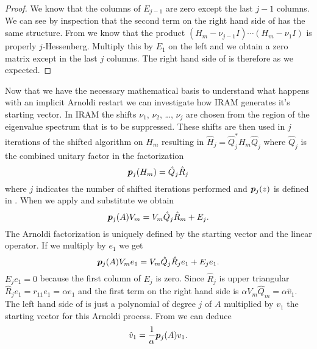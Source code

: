 \begin{proof}
We know that the columns of $E_{j-1}$ are zero except the last $j-1$ columns.  We can see by inspection that the second term on the right hand side of  has the same structure.  From  we know that the product $\left(H_m - \nu_{j-1}I\right)\cdots\left(H_m - \nu_1I\right)$ is properly $j$-Hessenberg.  Multiply this by $E_1$ on the left and we obtain a zero matrix except in the last $j$ columns.  The right hand side of  is therefore as we expected.
\end{proof}

Now that we have the necessary mathematical basis to understand what happens with an implicit Arnoldi restart we can investigate how IRAM generates it's starting vector.    In IRAM the shifts $\nu_1$, $\nu_2$, \ldots, $\nu_j$ are chosen from the region of the eigenvalue spectrum that is to be suppressed.  These shifts are then used in $j$ iterations of the shifted \QR algorithm on $H_m$ resulting in $\hat{H}_j = \hat{Q}_j^*H_m\hat{Q}_j$ where $\hat{Q}_j$ is the combined unitary factor in the \QR factorization
\begin{equation}
    \bm{p}_j(H_m) = \hat{Q}_j\hat{R}_j
    \label{eq:HmPolynomial}
\end{equation}
where $j$ indicates the number of shifted \QR iterations performed and $\bm{p}_j(z)$ is defined in .  When we apply  and substitute  we obtain
\begin{equation}
    \bm{p}_j(A)V_m = V_m\hat{Q}_j\hat{R}_m + E_j.
    \label{eq:PolyArnoldiFactAllColumns}
\end{equation}
The Arnoldi factorization is uniquely defined by the starting vector and the linear operator.  If we multiply  by $e_1$ we get
\begin{equation}
    \bm{p}_j(A)V_me_1 = V_m\hat{Q}_j\hat{R}_je_1 + E_je_1.
    \label{eq:PolyArnoldiFactColumn1}
\end{equation}
$E_je_1 = 0$ because the first column of $E_j$ is zero.  Since $\hat{R}_j$ is upper triangular \mbox{$\hat{R}_je_1 = r_{11}e_1 = \alpha e_1$} and the first term on the right hand side is \mbox{$\alpha V_m\hat{Q}_m = \alpha \hat{v}_1$}.  The left hand side of  is just a polynomial of degree $j$ of $A$ multiplied by $v_1$ the starting vector for this Arnoldi process.  From  we can deduce
\begin{equation}
    \hat{v}_1 = \frac{1}{\alpha}\bm{p}_j(A)v_1.
    \label{eq:IRAMRestartVector}
\end{equation}

